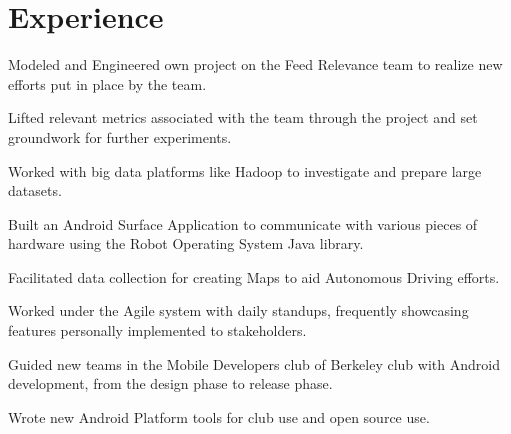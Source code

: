 \documentclass[]{format}
\begin{document}
\begin{minipage}[t]{0.66\textwidth} 


\section{Experience}
\vspace{\topsep} %
\begin{tightemize}
\item Modeled and Engineered own project on the Feed Relevance team to realize new efforts put in place by the team.
\item Lifted relevant metrics associated with the team through the project and set groundwork for further experiments.
\item Worked with big data platforms like Hadoop to investigate and prepare large datasets.
\end{tightemize}
\sectionsep

\begin{tightemize}
\item Built an Android Surface Application to communicate with various pieces of hardware using the Robot
Operating System Java library.
\item Facilitated data collection for creating Maps to aid Autonomous Driving efforts.
\item Worked under the Agile system with daily standups, frequently showcasing features personally implemented to stakeholders.
\end{tightemize}
\sectionsep

\begin{tightemize}
\item Guided new teams in the Mobile Developers club of Berkeley club with Android development, from the design phase
to release phase.
\item Wrote new Android Platform tools for club use and open source use.
\end{tightemize}
\sectionsep


\end{minipage}
\end{document}
